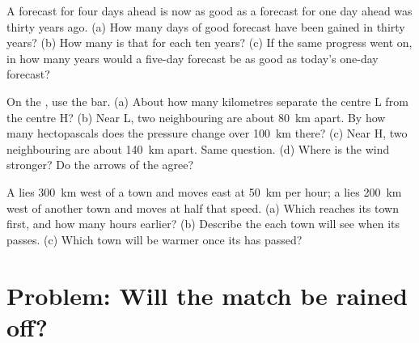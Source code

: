 \begin{exercise}[$\star\star$]\label{exo:g8:fronts-and-weather-maps:10}
A forecast for four days ahead is now as good as a forecast for one day
ahead was thirty years ago. (a) How many days of good forecast have been
gained in thirty years? (b) How many is that for each ten years? (c) If
the same progress went on, in how many years would a five-day forecast be
as good as today's one-day forecast?
\end{exercise}

\begin{exercise}[$\star\star\star$]\label{exo:g8:fronts-and-weather-maps:11}
On the  , use the  bar. (a) About how many kilometres
separate the centre L from the centre H? (b) Near L, two neighbouring
 are about \qty{80}{km} apart. By how many hectopascals does the
pressure change over \qty{100}{km} there? (c) Near H, two neighbouring
 are about \qty{140}{km} apart. Same question. (d) Where is the
wind stronger? Do the arrows of the  agree?
\end{exercise}

\begin{exercise}[$\star\star\star$]\label{exo:g8:fronts-and-weather-maps:12}
A  lies \qty{300}{km} west of a town and moves east at
\qty{50}{km} per hour; a  lies \qty{200}{km} west of another
town and moves at half that speed. (a) Which  reaches its town
first, and how many hours earlier? (b) Describe the  each town
will see when its  passes. (c) Which town will be warmer once its
 has passed?
\end{exercise}

\section{Problem: Will the match be rained off?}

